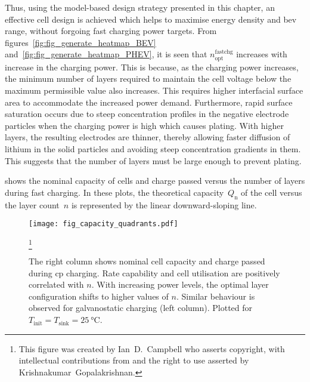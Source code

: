 Thus,   using    the   model-based    design   strategy   presented    in   this
chapter,   an   effective    cell   design   is   achieved    which   helps   to
maximise   energy   density  and   \gls{bev}   range,   without  forgoing   fast
charging   power    targets.   From   figures~\ref{fig:fig_generate_heatmap_BEV}
and~\ref{fig:fig_generate_heatmap_PHEV},       it       is       seen       that
$n^\text{fastchg}_\text{opt}$  increases with  increase in  the charging  power.
This is because,  as the charging power increases, the  minimum number of layers
required to maintain  the cell voltage below the maximum  permissible value also
increases.  This requires  higher interfacial  surface area  to accommodate  the
increased  power demand.  Furthermore, rapid  surface saturation  occurs due  to
steep  concentration  profiles in  the  negative  electrode particles  when  the
charging power is  high which causes plating. With higher  layers, the resulting
electrodes  are thinner,  thereby allowing  faster diffusion  of lithium  in the
solid  particles  and  avoiding  steep concentration  gradients  in  them.  This
suggests that the number of layers must be large enough to prevent plating.

 shows the nominal  capacity of cells and charge
passed versus  the number of  layers during fast  charging. In these  plots, the
theoretical  capacity~$Q_\text{n}$ of  the cell  versus the  layer count~$n$  is
represented by the linear downward-sloping line.

\begin{figure}[!bp]
    \begin{minipage}[t]{\textwidth}
        \centering
        \texttt{[image: fig\_capacity\_quadrants.pdf]}
        \captionsetup{labelsep=note}
        \caption[
        Nominal capacity and charge passed versus layer count for ---
        \emph{a}) constant current  charging and \emph{b}) constant power  charging
        ]
        {
            The right column shows nominal cell capacity and charge passed
            during \gls{cp} charging. Rate capability and cell utilisation are positively
            correlated with $n$. With increasing power levels, the optimal layer configuration shifts to higher
            values of $n$. Similar behaviour is observed for galvanostatic
            charging (left column). Plotted for \mbox{$T_\text{init} =
            T_\text{sink} = \SI{25}{\degreeCelsius}$}.
        }
        \label{fig:fig_CapacityQuadrants}
        \mpfootnotes[1]
        \footnote{This figure was created by \mbox{Ian D.\ Campbell} who asserts copyright,
            with intellectual contributions from and the right to use asserted by
        \mbox{Krishnakumar Gopalakrishnan}.}
    \end{minipage}
\end{figure}

